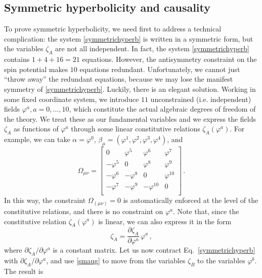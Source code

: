 \documentclass[12pt,aps,prd,nofootinbib,noshowkeys,noshowpacs,longbibliography,
superscriptaddress,tightenlines,floatfix,preprintnumbers]{revtex4-2}
\begin{document}
\subsection{Symmetric hyperbolicity and causality}\label{symmuzzo}

To prove symmetric hyperbolicity, we need first to address a technical complication: the system \eqref{symmetrichyperb} is written in a symmetric form, but the variables $\zeta_A$ are not all independent. In fact, the system \eqref{symmetrichyperb} contains $1+4+16=21$ equations. However, the antisymmetry constraint on the spin potential makes $10$ equations redundant. Unfortunately, we cannot just ``throw away'' the redundant equations, because we may lose the manifest symmetry of \eqref{symmetrichyperb}. Luckily, there is an elegant solution. Working in some fixed coordinate system, we introduce $11$ unconstrained (i.e. independent) fields $\varphi^a,a=0,...,10$, which constitute the actual algebraic degrees of freedom of the theory. We treat these as our fundamental variables and we express the fields $\zeta_A$ as functions of $\varphi^a$ through some linear constitutive relations $\zeta_A(\varphi^a)$. For example, we can take $\alpha=\varphi^0$, $\beta_\mu=(\varphi^1,\varphi^2,\varphi^3,\varphi^4)$, and
\begin{equation}
    \Omega_{\mu \nu} = 
    \begin{bmatrix}
    0 & \varphi^5 & \varphi^6 & \varphi^7 \\
    -\varphi^5 & 0 & \varphi^8 & \varphi^9 \\
    -\varphi^6 & -\varphi^8 & 0 & \varphi^{10} \\
    -\varphi^7 & -\varphi^9 & -\varphi^{10} & 0 \\
    \end{bmatrix} \, .
\end{equation}
In this way, the constraint $\Omega_{(\mu \nu)}=0$ is automatically enforced at the level of the constitutive relations, and there is no constraint on  $\varphi^a$. Note that, since the constitutive relation $\zeta_A(\varphi^a)$ is linear, we can also express it in the form
\begin{equation}\label{smaug}
    \zeta_A = \dfrac{\partial \zeta_A}{\partial \varphi^a} \, \varphi^a \, ,
\end{equation}
where $\partial \zeta_A /\partial \varphi^a$ is a constant matrix. Let us now contract Eq.~\eqref{symmetrichyperb} with $\partial \zeta_A /\partial \varphi^a$, and use \eqref{smaug} to move from the variables $\zeta_B$  to the variables $\varphi^b$. The result is
\end{document}
